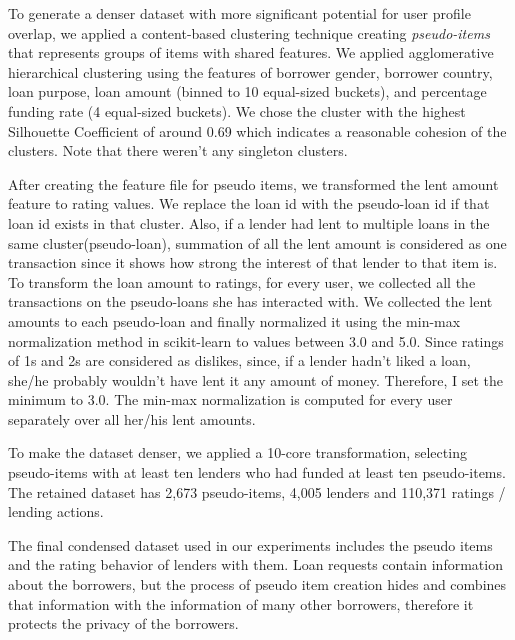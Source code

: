     To generate a denser dataset with more significant potential for user profile overlap, we applied a content-based clustering technique creating \textit{pseudo-items} that represents groups of items with shared features. We applied agglomerative hierarchical clustering \cite{rokach2005clustering} using the features of borrower gender, borrower country, loan purpose, loan amount (binned to 10 equal-sized buckets), and percentage funding rate (4 equal-sized buckets). We chose the cluster with the highest Silhouette Coefficient \cite{rousseeuw1987silhouettes} of around 0.69 which indicates a reasonable cohesion of the clusters. Note that there weren't any singleton clusters.
    
    After creating the feature file for pseudo items, we transformed the lent amount feature to rating values. We replace the loan id with the pseudo-loan id if that loan id exists in that cluster. Also, if a lender had lent to multiple loans in the same cluster(pseudo-loan), summation of all the lent amount is considered as one transaction since it shows how strong the interest of that lender to that item is.
    To transform the loan amount to ratings, for every user, we collected all the transactions on the pseudo-loans she has interacted with. We collected the lent amounts to each pseudo-loan and finally normalized it using the min-max normalization method in scikit-learn \cite{scikit-learn} to values between 3.0 and 5.0. Since ratings of 1s and 2s are considered as dislikes, since, if a lender hadn't liked a loan, she/he probably wouldn't have lent it any amount of money. Therefore, I set the minimum to 3.0. The min-max normalization is computed for every user separately over all her/his lent amounts.

    To make the dataset denser, we applied a 10-core transformation, selecting pseudo-items with at least ten lenders who had funded at least ten pseudo-items. The retained dataset has 2,673 pseudo-items, 4,005 lenders and 110,371 ratings / lending actions.
    

    The final condensed dataset used in our experiments includes the pseudo items and the rating behavior of lenders with them. Loan requests contain information about the borrowers, but the process of pseudo item creation hides and combines that information with the information of many other borrowers, therefore it protects the privacy of the borrowers. 
    
